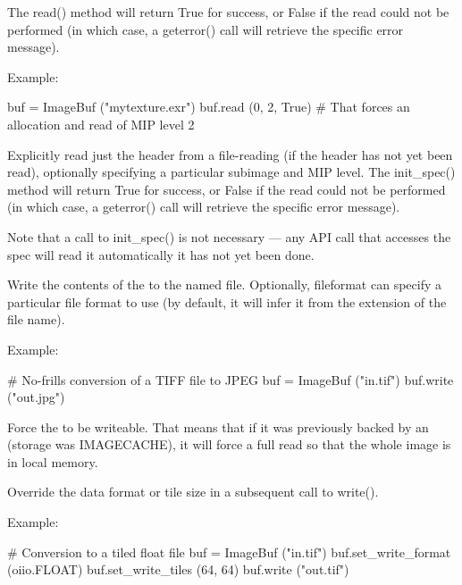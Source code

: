 The {\cf read()} method will return {\cf True} for success, or {\cf False}
if the read could not be performed (in which case, a {\cf geterror()} call
will retrieve the specific error message).

\noindent Example:
\begin{code}
    buf = ImageBuf ("mytexture.exr")
    buf.read (0, 2, True)
    # That forces an allocation and read of MIP level 2
\end{code}
\apiend


Explicitly read just the header from a file-reading \ImageBuf (if the header
has not yet been read), optionally specifying a particular subimage and MIP
level. The {\cf init_spec()} method will return {\cf True} for success, or
{\cf False} if the read could not be performed (in which case, a {\cf
geterror()} call will retrieve the specific error message).

Note that a call to {\cf init_spec()} is not necessary --- any \ImageBuf API
call that accesses the spec will read it automatically it has not yet been
done.
\apiend

Write the contents of the \ImageBuf to the named file.  Optionally, {\cf
fileformat} can specify a particular file format to use (by default, it
will infer it from the extension of the file name).

\noindent Example:
\begin{code}
    # No-frills conversion of a TIFF file to JPEG
    buf = ImageBuf ("in.tif")
    buf.write ("out.jpg")
\end{code}
\apiend

Force the \ImageBuf to be writeable. That means that if it was previously
backed by an \ImageCache (storage was {\cf IMAGECACHE}), it will force a
full read so that the whole image is in local memory.
\apiend


Override the data format or tile size in a subsequent call to {\cf write()}.

\noindent Example:
\begin{code}
    # Conversion to a tiled float file
    buf = ImageBuf ("in.tif")
    buf.set_write_format (oiio.FLOAT)
    buf.set_write_tiles (64, 64)
    buf.write ("out.tif")
\end{code}
\apiend

